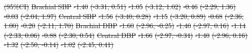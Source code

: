 \documentclass[
  letterpaper,
  DIV=11,
  numbers=noendperiod]{scrartcl}
\makeatletter
\renewenvironment{table}%
   {\renewcommand\familydefault\sfdefault
    \@float{table}}
   {\end@float}
\providecommand{\DIFdel}[1]{{\protect\color{red}\sout{#1}}}                      %
\providecommand{\DIFdelFL}[1]{\DIFdel{#1}} %
\providecommand{\DIFaddbeginFL}{} %
\providecommand{\DIFdelendFL}{} %
\newcommand{\DIFaddincludegraphics}[2][]{{\color{blue}\fbox{\DIFOincludegraphics[#1]{#2}}}} %
\DeclareRobustCommand{\DIFaddbeginFL}{\DIFOaddbeginFL \let\includegraphics\DIFaddincludegraphics} %
\DeclareRobustCommand{\DIFdelendFL}{\DIFOaddendFL \let\includegraphics\DIFOincludegraphics} %
\makeatother
\begin{document}
\begin{table}
\DIFdelFL{(95\%CI)}%
\DIFdelFL{Brachial SBP }%
\DIFdelFL{-1.40 }%
\DIFdelFL{(-3.31, 0.51) }%
\DIFdelFL{-1.05 }%
\DIFdelFL{(-3.12, 1.02) }%
\DIFdelFL{-0.46 }%
\DIFdelFL{(-2.29, 1.36) }%
\DIFdelFL{-0.03 }%
\DIFdelFL{(-2.04, 1.97)}%
\DIFdelFL{Central SBP }%
\DIFdelFL{-1.56 }%
\DIFdelFL{(-3.40, 0.28) }%
\DIFdelFL{-1.15 }%
\DIFdelFL{(-3.20, 0.89) }%
\DIFdelFL{-0.68 }%
\DIFdelFL{(-2.36, 1.00) }%
\DIFdelFL{-0.20 }%
\DIFdelFL{(-2.11, 1.70)}%
\DIFdelFL{Brachial DBP }%
\DIFdelFL{-1.60 }%
\DIFdelFL{(-2.96, -0.25) }%
\DIFdelFL{-1.40 }%
\DIFdelFL{(-2.97, 0.16) }%
\DIFdelFL{-1.14 }%
\DIFdelFL{(-2.33, 0.06) }%
\DIFdelFL{-0.88 }%
\DIFdelFL{(-2.30, 0.54)}%
\DIFdelFL{Central DBP }%
\DIFdelFL{-1.66 }%
\DIFdelFL{(-2.97, -0.34) }%
\DIFdelFL{-1.40 }%
\DIFdelFL{(-2.96, 0.16) }%
\DIFdelFL{-1.32 }%
\DIFdelFL{(-2.50, -0.14) }%
\DIFdelFL{-1.02 }%
\DIFdelFL{(-2.45, 0.41)}%
\DIFdelendFL \DIFaddbeginFL \centering{

}
\end{table}
\end{document}
